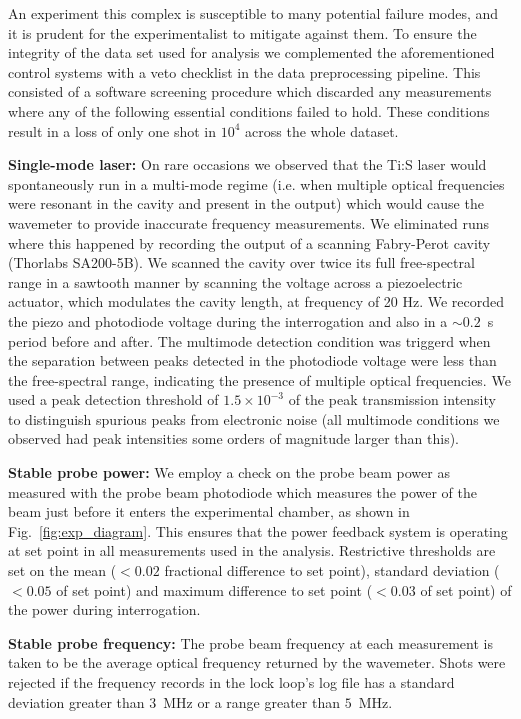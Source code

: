 	An experiment this complex is susceptible to many potential failure modes, and it is prudent for the experimentalist to mitigate against them.
	To ensure the integrity of the data set used for analysis we complemented the aforementioned control systems with a veto checklist in the data preprocessing pipeline.
	This consisted of a software screening procedure which discarded any measurements where any of the following essential conditions failed to hold. These conditions result in a loss of only one shot in $10^{4}$ across the whole dataset. 

	\textbf{Single-mode laser:}	On rare occasions we observed that the Ti:S laser would spontaneously run in a multi-mode regime (i.e. when multiple optical frequencies were resonant in the cavity and present in the output) which would cause the wavemeter to provide inaccurate frequency measurements. We eliminated runs where this happened by recording the output of a scanning Fabry-Perot cavity (Thorlabs SA200-5B). We scanned the cavity over twice its full free-spectral range in a sawtooth manner by scanning the voltage across a piezoelectric actuator, which modulates the cavity length, at frequency of 20 Hz. 
	We recorded the piezo and photodiode voltage during the interrogation and also in a $\sim0.2$~s period before and after.
	The multimode detection condition was triggerd when the separation between peaks detected in the photodiode voltage were less than the free-spectral range, indicating the presence of multiple optical frequencies.
	We used a peak detection threshold of $1.5\times10^{-3}$ of the peak transmission intensity to distinguish spurious peaks from electronic noise (all multimode conditions we  observed had peak intensities some orders of magnitude larger than this).

	\textbf{Stable probe power:}		We employ a check on the probe beam power as measured with the probe beam photodiode which measures the power of the beam just before it enters the experimental chamber, as shown in Fig.~\ref{fig:exp_diagram}. This ensures that the power feedback system is operating at set point in all measurements used in the analysis. Restrictive thresholds are set on the mean ($<0.02$ fractional difference to set point), standard deviation ($<0.05$ of set point) and maximum difference to set point ($<0.03$ of set point) of the power during interrogation.

	\textbf{Stable probe frequency:}		The probe beam frequency at each measurement is taken to be the average optical frequency returned by the wavemeter. Shots were rejected if the frequency records in the lock loop's log file has a standard deviation greater than $3$~MHz or a range greater than $5$~MHz.

